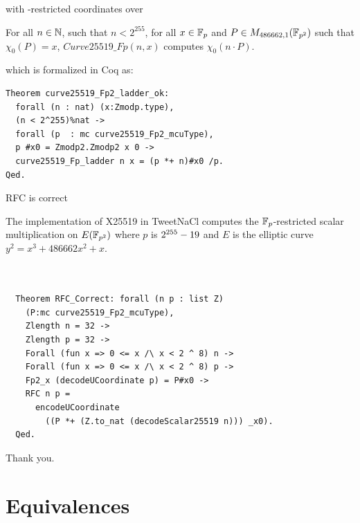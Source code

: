 \documentclass[8pt,aspectratio=169]{beamer}
\begin{document}
%
%
\begin{frame}[fragile]{with -restricted coordinates over }
	\begin{theorem}
		\label{thm:general-scalarmult}
		For all $n \in \mathbb{N}$, such that $n < 2^{255}$,
		for all $x \in \mathbb{F}_{p}$ and $P \in M_{486662,1}(\mathbb{F}_{p^2})$ such that $\chi_0(P) = x$,
		$Curve25519\_Fp(n,x)$ computes $\chi_0(n \cdot P)$.
	\end{theorem}
	which is formalized in Coq as:
	\begin{lstlisting}[language=Coq, basicstyle=\normalsize]
Theorem curve25519_Fp2_ladder_ok:
  forall (n : nat) (x:Zmodp.type),
  (n < 2^255)%nat ->
  forall (p  : mc curve25519_Fp2_mcuType),
  p #x0 = Zmodp2.Zmodp2 x 0 ->
  curve25519_Fp_ladder n x = (p *+ n)#x0 /p.
Qed.
\end{lstlisting}

\end{frame}


%
%
\begin{frame}[fragile]{RFC is correct}
	\begin{informaltheorem}
		The implementation of X25519 in TweetNaCl computes the
		$\mathbb{F}_{p}$-restricted \xcoord scalar multiplication on $E(\mathbb{F}_{p^2})$ where $p$ is $2^{255}-19$
		and $E$ is the elliptic curve $y^2 = x^3 + 486662 x^2 + x$.
	\end{informaltheorem}

	\begin{lstlisting}[language=Coq, basicstyle=\normalsize]


  Theorem RFC_Correct: forall (n p : list Z)
    (P:mc curve25519_Fp2_mcuType),
    Zlength n = 32 ->
    Zlength p = 32 ->
    Forall (fun x => 0 <= x /\ x < 2 ^ 8) n ->
    Forall (fun x => 0 <= x /\ x < 2 ^ 8) p ->
    Fp2_x (decodeUCoordinate p) = P#x0 ->
    RFC n p =
      encodeUCoordinate
        ((P *+ (Z.to_nat (decodeScalar25519 n))) _x0).
  Qed.
  \end{lstlisting}
\end{frame}

%
%
\begin{frame}[standout]
	\Huge Thank you.
\end{frame}


\appendix

\section{Equivalences}
\end{document}

